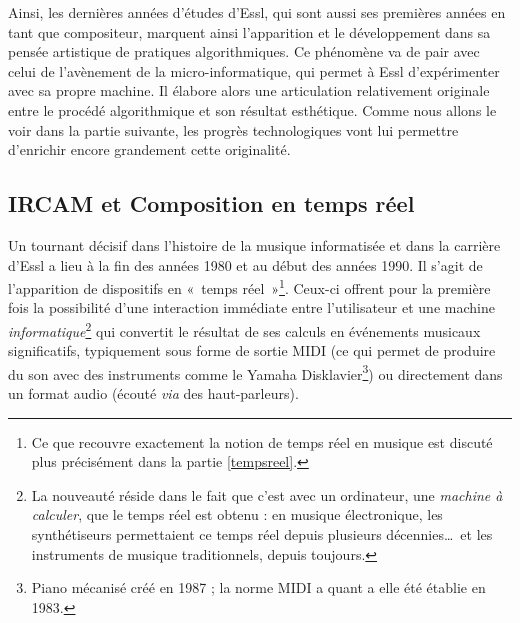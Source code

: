 \documentclass[a4paper,12pt]{article}
\newcommand{\guill}[1]{«~#1~»}
\begin{document}

Ainsi, les dernières années d'études d'Essl, qui sont aussi ses premières années en tant que compositeur, marquent ainsi l'apparition et le développement dans sa pensée artistique de pratiques algorithmiques. Ce phénomène va de pair avec celui de l'avènement de la micro-informatique, qui permet à Essl d'expérimenter avec sa propre machine. Il élabore alors une articulation relativement originale entre le procédé algorithmique et son résultat esthétique. Comme nous allons le voir dans la partie suivante, les progrès technologiques vont lui permettre d'enrichir encore grandement cette originalité.

\subsection{IRCAM et Composition en temps réel}
\label{ircam}

Un tournant décisif dans l'histoire de la musique informatisée et dans la carrière d'Essl a lieu à la fin des années 1980 et au début des années 1990. Il s'agit de l'apparition de dispositifs en \guill{temps réel}\footnote{Ce que recouvre exactement la notion de temps réel en musique est discuté plus précisément dans la partie \ref{tempsreel}.}. Ceux-ci offrent pour la première fois la possibilité d'une interaction immédiate entre l'utilisateur et une machine \emph{informatique}\footnote{La nouveauté réside dans le fait que c'est avec un ordinateur, une \emph{machine à calculer}, que le temps réel est obtenu : en musique électronique, les synthétiseurs permettaient ce temps réel depuis plusieurs décennies\dots~et les instruments de musique traditionnels, depuis toujours.} qui convertit le résultat de ses calculs en événements musicaux significatifs, typiquement sous forme de sortie MIDI (ce qui permet de produire du son avec des instruments comme le Yamaha Disklavier\footnote{Piano mécanisé créé en 1987 ; la norme MIDI a quant a elle été établie en 1983.}) ou directement dans un format audio (écouté \emph{via} des haut-parleurs).
\end{document}
